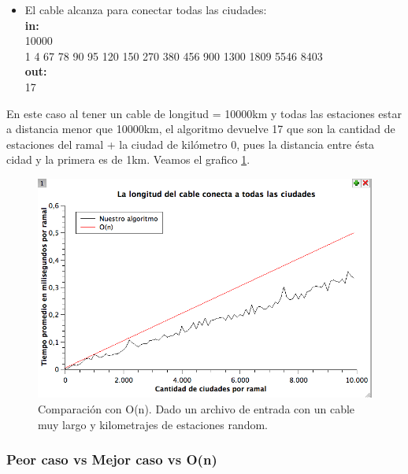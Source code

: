 \begin{itemize}
\item El cable alcanza para conectar todas las ciudades:\\
\textbf{in:}\\
10000\\
1 4 67 78 90 95 120 150 270 380 456 900 1300 1809 5546 8403\\
\textbf{out:}\\
17\\
\end{itemize}
En este caso al tener un cable de longitud = 10000km y todas las estaciones estar a distancia menor que 10000km, el algoritmo devuelve 17 que son la cantidad de estaciones del ramal + la ciudad de kilómetro 0, pues la distancia entre ésta cidad y la primera es de 1km. Veamos el grafico \ref{ej1-tiempo-vs-cant-ciudades-random-long-cable-largo}. \\

\begin{figure}[H]
\begin{center}

  \includegraphics[width=\linewidth]{../graficos/ej1/CableLargo.png}
  \caption{{\small Comparación con O(n). Dado un archivo de entrada con un cable muy largo y kilometrajes de estaciones random.}} \label{ej1-tiempo-vs-cant-ciudades-random-long-cable-largo}
\endminipage

\end{center}
\end{figure}

\subsubsection{Peor caso vs Mejor caso vs O(n)}


